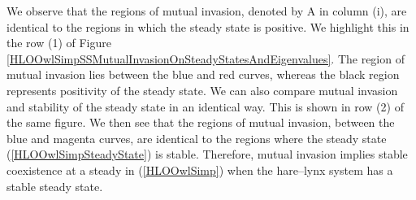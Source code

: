 \documentclass[12pt]{UOthesis}
\theoremstyle{remarkstyle}
\begin{document}
We observe that the regions of mutual invasion, denoted by A in column (i), are identical to the regions in which the steady state is positive. We highlight this in the row (1) of Figure \ref{HLOOwlSimpSSMutualInvasionOnSteadyStatesAndEigenvalues}. The region of mutual invasion lies between the blue and red curves, whereas the black region represents positivity of the steady state. We can also compare mutual invasion and stability of the steady state in an identical way. This is shown in row (2) of the same figure. We then see that the regions of mutual invasion, between the blue and magenta curves, are identical to the regions where the steady state (\ref{HLOOwlSimpSteadyState}) is stable. Therefore, mutual invasion implies stable coexistence at a steady in (\ref{HLOOwlSimp}) when the hare--lynx system has a stable steady state.
\end{document}
